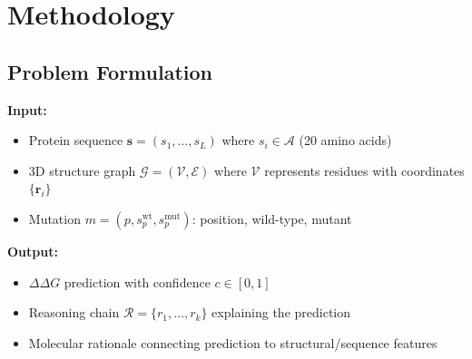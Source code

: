 \documentclass[11pt]{article}
\newcommand{\ddG}{\Delta\Delta G}
\begin{document}
\section{Methodology}

\subsection{Problem Formulation}

\textbf{Input:} 
\begin{itemize}
    \item Protein sequence $\mathbf{s} = (s_1, \ldots, s_L)$ where $s_i \in \mathcal{A}$ (20 amino acids)
    \item 3D structure graph $\mathcal{G} = (\mathcal{V}, \mathcal{E})$ where $\mathcal{V}$ represents residues with coordinates $\{\mathbf{r}_i\}$
    \item Mutation $m = (p, s_p^{\text{wt}}, s_p^{\text{mut}})$: position, wild-type, mutant
\end{itemize}

\textbf{Output:} 
\begin{itemize}
    \item $\ddG$ prediction with confidence $c \in [0,1]$
    \item Reasoning chain $\mathcal{R} = \{r_1, \ldots, r_k\}$ explaining the prediction
    \item Molecular rationale connecting prediction to structural/sequence features
\end{itemize}







\appendix
\end{document}
